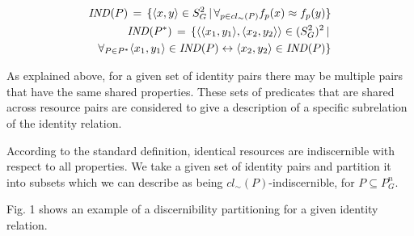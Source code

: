 \small
\begin{definition}[Indiscernibility]
\begin{align}
\label{def:resource_indiscernability}
\mathit{IND}(P) \,=\,
  \{
    \langle x,y\rangle \in S_G^2
  \,\vert\,
    \forall_{p \in cl_{\sim}(P)} f_p(x) \approx f_p(y)
  \}
\\
\label{pair indiscernibility}
\mathit{IND}(P^*) \,=\,
  \{
    \langle\langle x_1,y_1\rangle,\langle x_2,y_2\rangle\rangle \in (S_G^2)^2
  \,\vert\,\\
    \forall_{P \in P^*}
        \langle x_1,y_1\rangle \in \mathit{IND}(P)
      \leftrightarrow 
        \langle x_2,y_2\rangle \in \mathit{IND}(P)
  \}\nonumber
\end{align}
\end{definition}
\normalsize

\noindent As explained above, for a given set of identity pairs there
  may be multiple pairs that have the same shared properties.
These sets of predicates that are shared across resource pairs are
  considered to give a description of a specific subrelation of
  the identity relation.

According to the standard definition,
  identical resources are indiscernible with respect to all properties.
We take a given set of identity pairs and partition it into subsets which
  we can describe as being $cl_{\sim}(P)$-indiscernible,
  for $P \subseteq P_G^n$.

Fig. 1 shows an example
  of a discernibility partitioning for a given identity relation.

\begin{comment}
\begin{figure*}
\label{fig:iimb_example}
\centering
\texttt{[image: iimb\_approximation\_example\_crop]}
\caption{
  An example of a discernibility partition for an identity relation
    consisting of 365 pairs applied to the fourth IIMB linkset.
  Each node is annotated with the set of predicates $P$ for which
    its pairs are $P$-indiscernible.
  The number of identity pairs within each partition set
    is displayed to the right of the predicate set label.
  Partition sets that contain no identity pair are not show.
  The number that occurs to the left of the predicate label in each node
    indicates how may pairs in that node are identity pairs.
  The lower approximation consists of the nodes with a solid border,
    indicating that they contain only identity pairs.
  The higher approximation consists of all displayed nodes.}
\end{figure*}
\end{comment}

